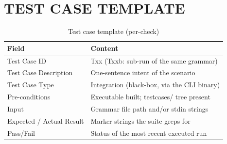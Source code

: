 \documentclass[12pt,a4paper,oneside,openany]{report}
\begin{document}
\section{TEST CASE TEMPLATE}
\begin{table}[h]
  \caption{Test case template (per-check)}
  \label{tab:tc_template}
  \small
  \begin{tabularx}{\textwidth}{p{3.2cm}X}
    \toprule
    \textbf{Field} & \textbf{Content} \\
    \midrule
    Test Case ID & Txx (Txxb: sub-run of the same grammar) \\
    Test Case Description & One-sentence intent of the scenario \\
    Test Case Type & Integration (black-box, via the CLI binary) \\
    Pre-conditions & Executable built; testcases/ tree present \\
    Input & Grammar file path and/or stdin strings \\
    Expected / Actual Result & Marker strings the suite greps for \\
    Pass/Fail & Status of the most recent executed run \\
    \bottomrule
  \end{tabularx}
\end{table}
\end{document}

